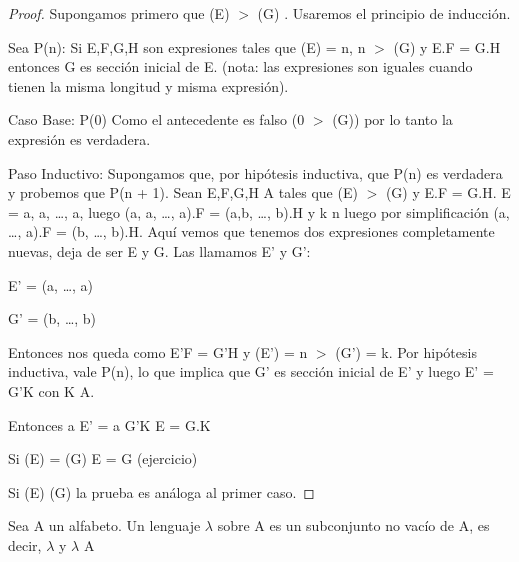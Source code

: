 \begin{proof}
Supongamos primero que \length(E) \(>\) \length(G) . Usaremos el principio de inducci\'on.  

Sea P(n): Si E,F,G,H son expresiones tales que \length(E) = n, n \(>\) \length(G) y E.F = G.H entonces G es secci\'on inicial de E. (nota: las expresiones son iguales cuando tienen la misma longitud y misma expresi\'on). 

Caso Base: P(0) Como el antecedente es falso (0 \(>\) \length(G)) por lo tanto la expresi\'on es verdadera.

Paso Inductivo: Supongamos que, por hip\'otesis inductiva, que P(n) es verdadera y probemos que P(n + 1). Sean E,F,G,H \cin A\supi{*} tales que \length(E) \(>\) \length(G) y E.F = G.H. E = a, a, \ldots, a, luego (a, a, \ldots, a).F = (a,b, \ldots, b).H y k \< n luego por simplificaci\'on (a, \ldots, a).F = (b, \ldots, b).H. Aqu\'i vemos que tenemos dos expresiones completamente nuevas, deja de ser E y G. Las llamamos E' y G':

E' = (a, \ldots, a)

G' = (b, \ldots, b) 

Entonces nos queda como E'F = G'H y \length(E') = n \(>\) \length(G') = k. Por hip\'otesis
inductiva, vale P(n), lo que implica que G' es secci\'on inicial de E' y luego E' = G'K  con K \cin A\supi{*}.

Entonces a E' = a G'K \then E = G.K

Si \length(E) = \length(G) \then E = G (ejercicio)
  
Si \length(E) \< \length(G)  la prueba es an\'aloga al primer caso.

\end{proof}

\begin{definition}
Sea A un alfabeto. Un lenguaje \(\lambda\) sobre A es un subconjunto no vac\'io de
A\supi{*}, es decir, \(\lambda\) \cneq \cemptyset y \(\lambda\)
\csubseteq A\supi{*}
\end{definition}

